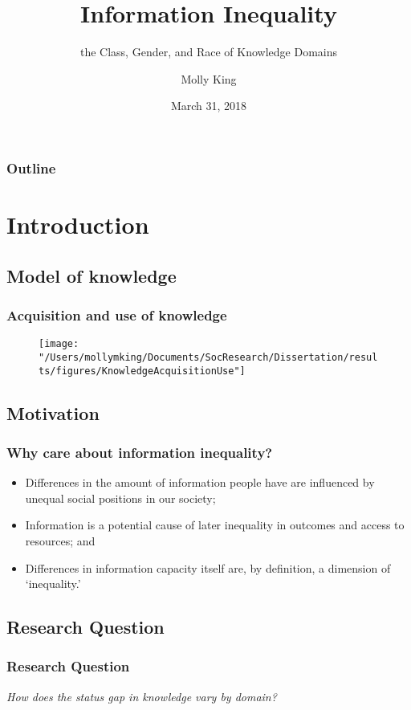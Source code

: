 \documentclass[pdf]{beamer}
\title{Information Inequality}
\subtitle{the Class, Gender, and Race of Knowledge Domains}
\author{Molly King}
\institute{Stanford University}
\date{March 31, 2018}
\begin{document}
\begin{frame}
  \titlepage
\end{frame}


\begin{frame}
\frametitle{Outline}
  \tableofcontents
\end{frame}

\section{Introduction}

\subsection{Model of knowledge}
\begin{frame}
\frametitle{Acquisition and use of knowledge}
 \begin{figure}[ht]
   \begin{center}
   \texttt{[image: "/Users/mollymking/Documents/SocResearch/Dissertation/results/figures/KnowledgeAcquisitionUse"]}
   \end{center}
 \end{figure}
\end{frame}


\subsection{Motivation}
\begin{frame}
\frametitle{Why care about information inequality?}
  \begin{itemize}
\item
  Differences in the amount of information people have are influenced by
  unequal social positions in our society;
\pause
\item
  Information is a potential cause of later inequality in outcomes and
  access to resources; and
\pause
\item
  Differences in information capacity itself are, by definition, a
  dimension of `inequality.'
  \end{itemize}
\end{frame}


\subsection{Research Question}
\begin{frame}
\frametitle{Research Question}
  \emph{How does the status gap in knowledge vary by domain?}
\end{frame}
\end{document}
